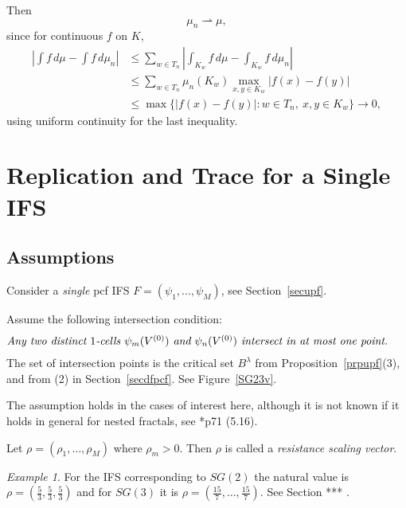 \documentclass[a4paper]{amsart}
\theoremstyle{plain}
\theoremstyle{definition}
\theoremstyle{remark}
\newtheorem{example}[theorem]{Example}
\begin{document}
Then
\begin{equation} \label{} 
\mu_n \rightharpoonup \mu,
\end{equation} 
since for continuous $ f $ on $ K $,
\begin{align*}
\left| \int f\, d\mu - \int f\, d\mu_n \right|   &\leq  
     \sum_{w \in T_n}  \left| \int_{K_w} f\, d\mu - \int_{K_w} f\, d\mu_n \right|  \\
     &  \leq  \sum_{w \in T_n}   \mu_n(K_w) \max_{x,y \in K_w } |f(x) - f(y)|  \\
      &\leq \max\{|f(x) - f(y)| :  w \in T_n,\ x,y \in K_w \} \to 0,
\end{align*} 
using uniform continuity for the last inequality.

\section{\textbf{Replication and Trace for a Single IFS}}\label{secrt}

\subsection{Assumptions}
Consider a \emph{single} pcf IFS  $F = (\psi_1,\dots, \psi_M) $, see Section~\ref{secupf}.

\medskip Assume the following intersection condition:
\begin{equation} \label{intcon}
\parbox{5in}{ \emph{Any two distinct $ 1 $-cells $ \psi  _m (V^{(0)}) $ and $ \psi  _n (V^{(0)}) $ intersect in at most one point.} }
\end{equation}
The set of intersection points    is   the critical set $ B^ \lambda $ from Proposition~\ref{prpupf}(3), and from (2) in Section~\ref{secdfpcf}.   See Figure~\ref{SG23v}.

The assumption holds in the cases of interest here, although it is not known if it holds in general for nested fractals, see \cite{Bar}*{p71 (5.16)}.  
 
  \medskip  Let $ \rho  = ( \rho _1,\dots, \rho _{M })$  where $ \rho  _m > 0 $.  Then $ \rho  $ is called a \emph{resistance scaling vector}.  
  
\begin{example}  \label{exinv}  For the IFS corresponding to $ SG(2) $ the natural value is $ \rho = (\frac{5}{3}, \frac{5}{3}  , \frac{5}{3} ) $ and for $ SG(3) $ it is $   \rho = (\frac{15}{7}, \dots  , \frac{15}{7} ) $.   See Section *** .
\end{example} 
\end{document}
